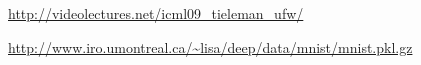 \documentclass[12pt,fleqn]{article}\usepackage{../common}
\begin{document}
\inputminted[fontsize=\footnotesize]{python}{rbmp.py}

\url{http://videolectures.net/icml09_tieleman_ufw/}

\url{http://www.iro.umontreal.ca/~lisa/deep/data/mnist/mnist.pkl.gz}
\end{document}
